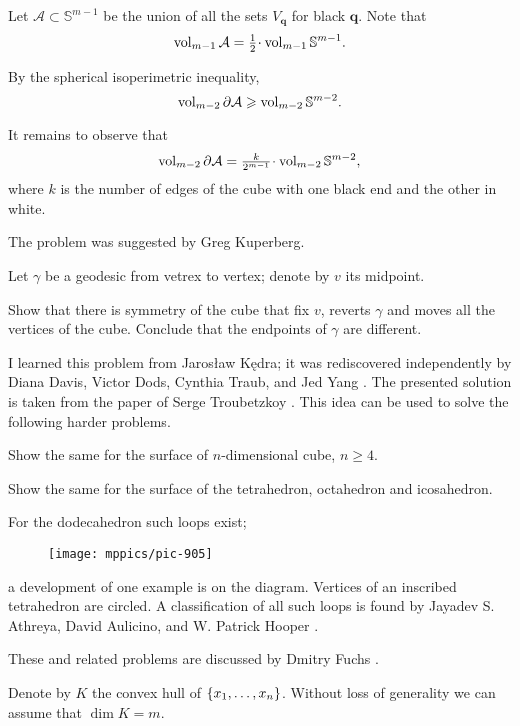 Let $\mathcal{A}\subset\mathbb{S}^{m-1}$ be the union of all the sets $V_{\bm{q}}$ for black $\bm{q}$.
Note that 
\[\vol_{m-1}\mathcal{A}=\tfrac12\cdot\vol_{m-1}\mathbb{S}^{m-1}.\]

By the spherical isoperimetric inequality,
\[\operatorname{\rm vol}\nolimits_{m-2}\partial\mathcal{A}
\geqslant \operatorname{\rm vol}\nolimits_{m-2}\mathbb{S}^{m-2}.\] 

It remains to observe that
\[\vol_{m-2}\partial\mathcal{A}
=
\tfrac k{2^{m-1}}\cdot\vol_{m-2}\mathbb{S}^{m-2},\]
where $k$ is the number of edges of the cube with one black end and the other in white.
\qeds

The problem was suggested by Greg Kuperberg.

Let $\gamma$ be a geodesic from vetrex to vertex;
denote by $v$ its midpoint.

Show that there is symmetry of the cube that fix $v$, reverts $\gamma$ and moves all the vertices of the cube.
Conclude that the endpoints of $\gamma$ are different.
\qeds

I learned this problem from Jaros{\l}aw K\k{e}dra; 
it was rediscovered independently by
Diana Davis,
Victor Dods,
Cynthia Traub,
and Jed Yang \cite{DDTY}.
The presented solution is taken from the paper of Serge Troubetzkoy \cite{troubetzkoy}.
This idea can be used to solve the following harder problems.

\begin{pr}
Show the same for the surface of $n$-dimensional cube, $n\ge 4$.
\end{pr}

\begin{pr}
 Show the same for the surface of the tetrahedron, octahedron and icosahedron.
\end{pr}

For the dodecahedron such loops exist;
\begin{figure}[!ht]
\vskip0mm
\centering
\texttt{[image: mppics/pic-905]}
\end{figure}
a development of one example is on the diagram.
Vertices of an inscribed tetrahedron are circled.
A classification of all such loops is found by Jayadev S. Athreya, David Aulicino, and W. Patrick Hooper \cite{athreya-aulicino-hooper}.

These and related problems are discussed by Dmitry Fuchs \cite{fuchs-2016}.

Denote by $K$ the convex hull of $\{x_1,\z\dots,x_n\}$.
Without loss of generality we can assume that $\dim K=m$. 


